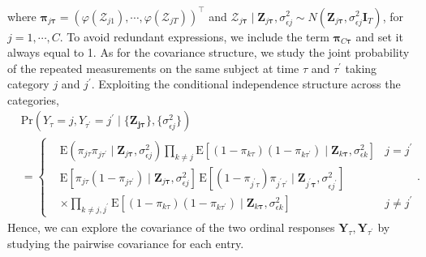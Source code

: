 where %
$\boldsymbol{\pi}_{j\boldsymbol{\tau}}=(\varphi(\boldsymbol{\mathcal{Z}}_{j1}),\cdots,\varphi(\boldsymbol{\mathcal{Z}}_{jT}))^{\top}$ 
and $\boldsymbol{\mathcal{Z}}_{j \boldsymbol{\tau}}\mid \mathbf{Z}_{j 
\boldsymbol{\tau}},\sigma_{\epsilon j}^2\sim N(\mathbf{Z}_{j \boldsymbol{\tau}},
\sigma_{\epsilon j}^2\mathbf{I}_T)$, for $j=1,\cdots,C$.
To avoid redundant expressions, we include the term $\boldsymbol{\pi}_{C\boldsymbol{\tau}}$ 
and set it always equal to 1. As for the covariance structure, we study the joint probability 
of the repeated measurements on the same subject at time $\tau$ and $\tau^{\prime}$ taking 
category $j$ and $j^{\prime}$. Exploiting the conditional independence structure across 
the categories, 
\begin{equation}
\begin{split}
	&\text{Pr}(Y_{\tau}=j,Y_{\tau^{\prime}}=j^{\prime}\mid\{\mathbf{Z}_{\boldsymbol{j \tau}}\},\{\sigma_{\epsilon j}^2\})\\
	&=\left\{\begin{aligned} & \text{E}(\pi_{j\tau}\pi_{j\tau^{\prime}}\mid \mathbf{Z}_{j \boldsymbol{\tau}},\sigma_{\epsilon j}^2)\prod_{k\neq j}\text{E}[(1-\pi_{k\tau})(1-\pi_{k\tau^{\prime}})\mid \mathbf{Z}_{k \boldsymbol{\tau}},\sigma_{\epsilon k}^2] & j=j^{\prime}\\ & \text{E}[\pi_{j\tau}(1-\pi_{j\tau^{\prime}})\mid \mathbf{Z}_{j \boldsymbol{\tau}},\sigma_{\epsilon j}^2] \, 
 \text{E}[(1-\pi_{j^{\prime}\tau})\pi_{j^{\prime}\tau^{\prime}}\mid \mathbf{Z}_{j^{\prime} \boldsymbol{\tau}},\sigma_{\epsilon j^{\prime}}^2] & \\
 &\times \prod_{k\neq j,j^{\prime}}\text{E}[(1-\pi_{k\tau})(1-\pi_{k\tau^{\prime}})\mid \mathbf{Z}_{k \boldsymbol{\tau}},\sigma_{\epsilon k}^2] & j\neq j^{\prime} \end{aligned}\right..
\end{split}
	\label{eq:jointprobmult}
\end{equation}  
Hence, we can explore the covariance of the two ordinal responses 
$\mathbf{Y}_{\tau},\mathbf{Y}_{\tau^{\prime}}$ by studying the pairwise covariance 
for each entry.  


